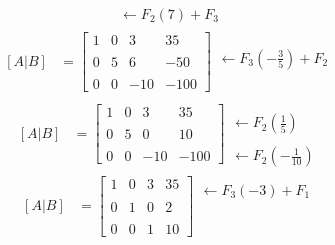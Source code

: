 \documentclass[10pt, a4paper]{article}
\begin{document}
\begin{multicols*}{2}
\begin{align*}
\begin{array}{r}
    \leftarrow F_2\left(7\right)+F_3
  \end{array}
\end{align*}
\begin{align*}
  \left[A|B\right]&=\left[
    \begin{array}{ccc|c}
      1 & 0 & 3 & 35 \\\\
      0 & 5 & 6 & -50 \\\\
      0 & 0 & -10 & -100
    \end{array}
  \right]
  \begin{array}{r}
    \\
    \leftarrow F_3\left(-\frac{3}{5}\right)+F_2
    \\\\
  \end{array}
\end{align*}
\begin{align*}
  \left[A|B\right]&=\left[
    \begin{array}{ccc|c}
      1 & 0 & 3 & 35 \\\\
      0 & 5 & 0 & 10 \\\\
      0 & 0 & -10 & -100
    \end{array}
  \right]
  \begin{array}{r}
    \\\\
    \leftarrow F_2\left(\frac{1}{5}\right)
    \\\\
    \leftarrow F_2\left(-\frac{1}{10}\right)
  \end{array}
\end{align*}
\begin{align*}
  \left[A|B\right]&=\left[
    \begin{array}{ccc|c}
      1 & 0 & 3 & 35 \\\\
      0 & 1 & 0 & 2 \\\\
      0 & 0 & 1 & 10
    \end{array}
  \right]
  \begin{array}{r}
    \leftarrow F_3\left(-3\right)+F_1
    \\\\\\
    \\\\
  \end{array}

\end{align*}
\end{multicols*}
\end{document}
